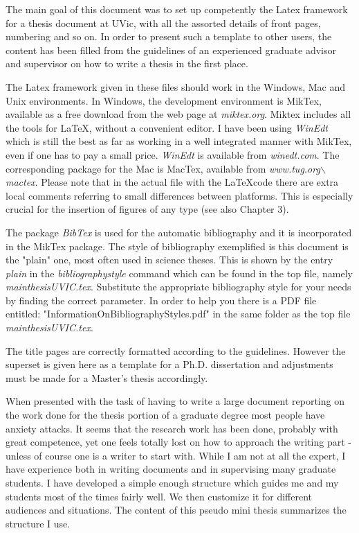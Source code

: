 

The main goal of this document was to set up competently the Latex framework for a thesis document at UVic, with all the assorted details of front pages, numbering and so on. In order to present such a template to other users, the content has been filled from the guidelines of an experienced graduate advisor and supervisor on how to write a thesis in the first place.

The Latex framework given in these files should work in the Windows, Mac and Unix environments. In Windows, the development environment is MikTex, available as a free download from the web page at \textit{miktex.org}. Miktex includes all the tools for \LaTeX, without a convenient editor. I have been using
\textit{WinEdt} which is still the best as far as working in a well integrated manner with MikTex, even if one has to pay a small price. \textit{WinEdt} is available from \textit{winedt.com}. The corresponding package for the Mac is MacTex, available from \textit{www.tug.org$\backslash$mactex}.
Please note that in the actual file with the \LaTeX code there are extra local comments referring to small differences between platforms. This is especially crucial for the insertion of figures of any type (see also Chapter 3).

The package \textit{BibTex} is used for the automatic bibliography and it is incorporated in the MikTex package. The style of bibliography exemplified is this document is the "plain" one,
most often used in science theses. This is shown
by the entry \textit{plain} in the \textit{bibliographystyle}
command which can be found in the top file, namely
\textit{mainthesisUVIC.tex}. Substitute the
appropriate bibliography style for your needs by finding
the correct parameter. In order to help you there is a PDF
file entitled: "InformationOnBibliographyStyles.pdf" in the
same folder as the top file \textit{mainthesisUVIC.tex}.

The title pages are correctly formatted according to the guidelines. However the superset is given here as a template for a Ph.D. dissertation and adjustments must be made for a Master's thesis accordingly.

When presented with the task of having to write a large document reporting on the work done for the thesis portion of a graduate degree most people have anxiety attacks. It seems that the research work has been done, probably with great competence, yet one feels totally lost on how to approach the writing part - unless of course one is a writer to start with. While I am not at all the expert, I have experience both in writing documents and in supervising many graduate students. I have developed a simple enough structure which guides me and my students most of the times fairly well. We then customize it for different audiences and situations. The content of this pseudo mini thesis summarizes the structure I use.

